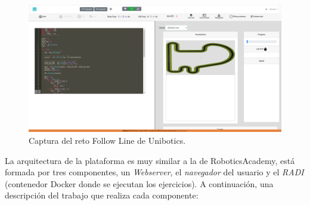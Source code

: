 \documentclass[a4paper, 12pt]{book}
\begin{document}
\begin{figure}[H]
	\centering
    \includegraphics[width=15cm]{img/follow_line.png}
    \caption{Captura del reto Follow Line de Unibotics.}
    \label{figura:unibotics_architecture}
\end{figure}

La arquitectura de la plataforma es muy similar a la de RoboticsAcademy, está formada por tres componentes, un \emph{Webserver}, el \emph{navegador} del usuario y el \emph{RADI} (contenedor Docker donde se ejecutan los ejercicios). A continuación, una descripción del trabajo que realiza cada componente:
\end{document}
